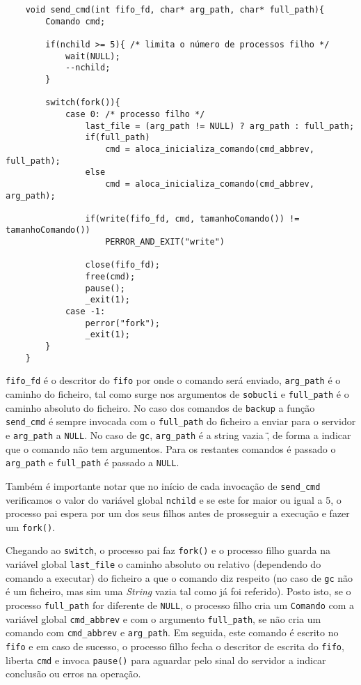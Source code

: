 \documentclass[a4paper,12pt,titlepage,draft,portuguese]{article}
\begin{document}
	\begin{verbatim}
	void send_cmd(int fifo_fd, char* arg_path, char* full_path){
		Comando cmd;

		if(nchild >= 5){ /* limita o número de processos filho */
			wait(NULL);
			--nchild;
		}

		switch(fork()){
			case 0: /* processo filho */
				last_file = (arg_path != NULL) ? arg_path : full_path;
				if(full_path)
					cmd = aloca_inicializa_comando(cmd_abbrev, full_path);
				else
					cmd = aloca_inicializa_comando(cmd_abbrev, arg_path);
				
				if(write(fifo_fd, cmd, tamanhoComando()) != tamanhoComando())
					PERROR_AND_EXIT("write")
				
				close(fifo_fd);
				free(cmd);
				pause();
				_exit(1);
			case -1:
				perror("fork");
				_exit(1);
		}
	}
	\end{verbatim}

\texttt{fifo_fd} é o descritor do \texttt{fifo} por onde o comando será enviado, \texttt{arg\_path} é o caminho do ficheiro, tal como surge nos argumentos de \texttt{sobucli} e \texttt{full_path} é o caminho absoluto do ficheiro. No caso dos comandos de \texttt{backup} a função \texttt{send\_cmd} é sempre invocada com o \texttt{full\_path} do ficheiro a enviar para o servidor e \texttt{arg\_path} a \texttt{NULL}. No caso de \texttt{gc},  \texttt{arg\_path} é a string vazia \"\", de forma a indicar que o comando não tem argumentos. Para os restantes comandos é passado o \texttt{arg_path} e \texttt{full_path} é passado a \texttt{NULL}.

Também é importante notar que no início de cada invocação de \texttt{send\_cmd} verificamos o valor do variável global \texttt{nchild} e se este for maior ou igual a 5, o processo pai espera por um dos seus filhos antes de prosseguir a execução e fazer um \texttt{fork()}.

Chegando ao \texttt{switch}, o processo pai faz \texttt{fork()} e o processo filho guarda na variável global \texttt{last\_file} o caminho absoluto ou relativo (dependendo do comando a executar) do ficheiro a que o comando diz respeito (no caso de \texttt{gc} não é um ficheiro, mas sim uma \emph{String} vazia tal como já foi referido). Posto isto, se o processo \texttt{full\_path} for diferente de \texttt{NULL}, o processo filho cria um \texttt{Comando} com a variável global \texttt{cmd_abbrev} e com o argumento \texttt{full\_path}, se não cria um comando com \texttt{cmd\_abbrev} e \texttt{arg\_path}. Em seguida, este comando é escrito no \texttt{fifo} e em caso de sucesso, o processo filho fecha o descritor de escrita do \texttt{fifo}, liberta \texttt{cmd} e invoca \texttt{pause()} para aguardar pelo sinal do servidor a indicar conclusão ou erros na operação.
\end{document}
